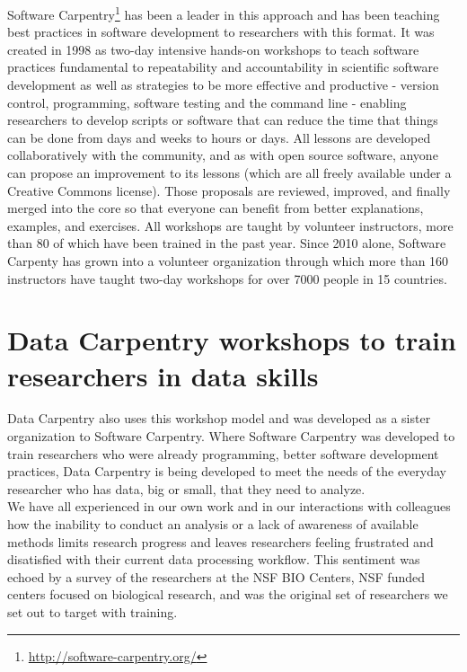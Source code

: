 \documentclass[15]{idcc}
\begin{document}
Software Carpentry\footnote{\url{http://software-carpentry.org/}} has been a leader in this approach and has been teaching best practices in software development to researchers with this format. It was created in 1998 as two-day
intensive hands-on workshops to teach software practices fundamental to repeatability and accountability in scientific software
development as well as strategies to be more effective and productive - version control, programming, software testing and the command
line - enabling researchers to develop scripts or software that can reduce the time that things can be done from days and weeks to hours
or days. All lessons are developed
collaboratively with the community, and as with open source software, anyone can propose an improvement to its lessons (which are all
freely available under a Creative Commons license).  Those proposals are reviewed, improved, and finally merged into the core so that
everyone can benefit from better explanations, examples, and exercises. All workshops are taught by volunteer instructors, more than 80
of which have been trained in the past year. Since 2010 alone, Software Carpenty has grown into a volunteer organization through which more than 160 instructors have
taught two-day workshops for over 7000 people in 15 countries.\\


\section{Data Carpentry workshops to train researchers in data skills}

Data Carpentry also uses this workshop model and was developed as a sister organization to Software Carpentry. Where Software
Carpentry was developed to train researchers who were already programming, better software development practices, Data Carpentry is
being developed to meet the needs of the everyday researcher who has data, big or small,
that they need to analyze.\\

We have all experienced in our own work and
in our interactions with colleagues how the inability to conduct an analysis or a lack of awareness of available
methods limits research progress and leaves researchers feeling frustrated and disatisfied with their current data processing workflow. This
sentiment was echoed by a survey of the researchers at the NSF BIO Centers, NSF funded centers focused on biological research, and
was the original set of researchers we set out to target with training.\\
\end{document}
